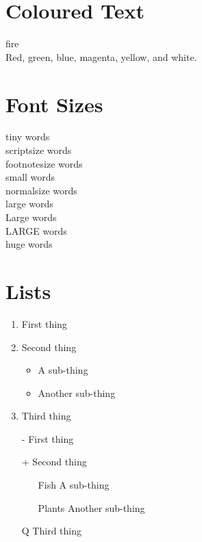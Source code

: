 \documentclass[a4paper, 12pt]{report}
\begin{document}
\section{Coloured Text}

{\color{red}fire} \\
{\color{red}Red}, {\color{green}green}, {\color{blue}blue}, {\color{magenta}magenta}, {\color{yellow}yellow}, and {\color{white}white}.

\section{Font Sizes}

{\tiny tiny words}\\
{\scriptsize scriptsize words}\\
{\footnotesize footnotesize words}\\
{\small small words}\\
{\normalsize normalsize words}\\
{\large large words}\\
{\Large Large words}\\
{\LARGE LARGE words}\\
{\huge huge words}


\section{Lists}

\begin{enumerate}
\item First thing
\item Second thing
\begin{itemize}
\item A sub-thing
\item Another sub-thing
\end{itemize}
\item Third thing
\end{enumerate}


\begin{itemize}
\item[-] First thing
\item[+] Second thing
\begin{itemize}
\item[Fish] A sub-thing
\item[Plants] Another sub-thing
\end{itemize}
\item[Q] Third thing
\end{itemize}
\end{document}
